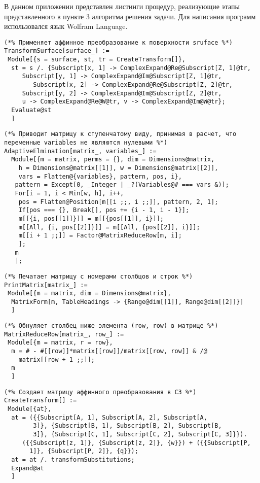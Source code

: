 \documentclass[../main.tex]{subfiles}
\begin{document}
В данном приложении представлен листинги процедур, реализующие этапы представленного в пункте 3 алгоритма решения задачи. Для написания программ использовался язык {\ttfamily Wolfram Language}. 

\begin{lstlisting}
(*% Применяет аффинное преобразование к поверхности sruface %*)
TransformSurface[surface_] :=
 Module[{s = surface, st, tr = CreateTransform[]},
  st = s /. {Subscript[x, 1] -> ComplexExpand@Re@Subscript[Z, 1]@tr, 
     Subscript[y, 1] -> ComplexExpand@Im@Subscript[Z, 1]@tr,
     	Subscript[x, 2] -> ComplexExpand@Re@Subscript[Z, 2]@tr, 
     Subscript[y, 2] -> ComplexExpand@Im@Subscript[Z, 2]@tr,
     u -> ComplexExpand@Re@W@tr, v -> ComplexExpand@Im@W@tr};
  Evaluate@st
  ]
\end{lstlisting}

\begin{lstlisting}
(*% Приводит матрицу к ступенчатому виду, принимая в расчет, что переменные variables не являются нулевыми %*)
AdaptiveElmination[matrix_, variables_] :=
  Module[{m = matrix, perms = {}, dim = Dimensions@matrix,
    h = Dimensions@matrix[[1]], w = Dimensions@matrix[[2]],
    vars = Flatten@{variables}, pattern, pos, i},
   pattern = Except[0, _Integer | _?(Variables@# === vars &)];
   For[i = 1, i < Min[w, h], i++,
    pos = Flatten@Position[m[[i ;;, i ;;]], pattern, 2, 1];
    If[pos === {}, Break[], pos += {i - 1, i - 1}];
    m[[{i, pos[[1]]}]] = m[[{pos[[1]], i}]];
    m[[All, {i, pos[[2]]}]] = m[[All, {pos[[2]], i}]];
    m[[i + 1 ;;]] = Factor@MatrixReduceRow[m, i];
    ];
   m
   ];
\end{lstlisting}

\begin{lstlisting}
(*% Печатает матрицу с номерами столбцов и строк %*)
PrintMatrix[matrix_] :=
 Module[{m = matrix, dim = Dimensions@matrix},
  MatrixForm[m, TableHeadings -> {Range@dim[[1]], Range@dim[[2]]}]
  ]
\end{lstlisting}

\begin{lstlisting}
(*% Обнуляет столбец ниже элемента (row, row) в матрице %*)
MatrixReduceRow[matrix_, row_] :=
 Module[{m = matrix, r = row},
  m = # - #[[row]]*matrix[[row]]/matrix[[row, row]] & /@ 
    matrix[[row + 1 ;;]];
  m
  ]
\end{lstlisting}

\begin{lstlisting}
(*% Создает матрицу аффинного преобразования в C3 %*)
CreateTransform[] :=
 Module[{at},
  at = ({{Subscript[A, 1], Subscript[A, 2], Subscript[A, 
        3]}, {Subscript[B, 1], Subscript[B, 2], Subscript[B, 
        3]}, {Subscript[C, 1], Subscript[C, 2], Subscript[C, 3]}}).
     ({{Subscript[z, 1]}, {Subscript[z, 2]}, {w}}) + ({{Subscript[P, 
       1]}, {Subscript[P, 2]}, {q}});
  at = at /. transformSubstitutions;
  Expand@at
  ]
\end{lstlisting}
\end{document}
